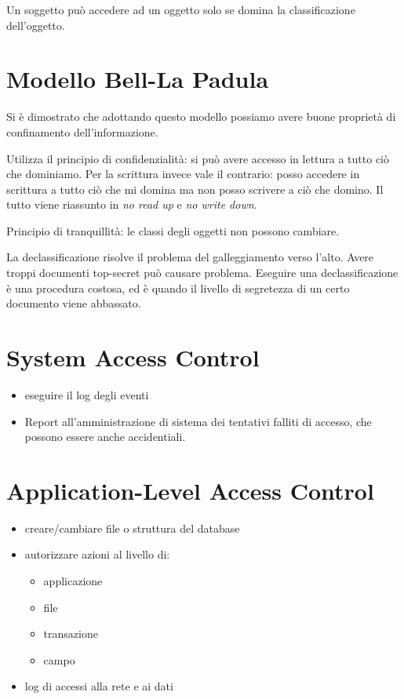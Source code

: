 Un soggetto può accedere ad un oggetto solo se domina la classificazione 
dell'oggetto.

\section{Modello Bell-La Padula}

Si è dimostrato che adottando questo modello possiamo avere buone proprietà di 
confinamento dell'informazione.

Utilizza il principio di confidenzialità: si può avere accesso in lettura a 
tutto ciò che dominiamo. Per la scrittura invece vale il contrario: posso 
accedere in scrittura a tutto ciò che mi domina ma non posso scrivere a ciò che 
domino. Il tutto viene riassunto in \textit{no read up} e \textit{no write 
down}.

Principio di tranquillità: le classi degli oggetti non possono cambiare.


La declassificazione risolve il problema del galleggiamento verso l'alto. Avere 
troppi documenti top-secret può causare problema. Eseguire una 
declassificazione è una procedura costosa, ed è quando il livello di segretezza 
di un certo documento viene abbassato.

\section{System Access Control}

\begin{itemize}
 \item eseguire il log degli eventi
 \item Report all'amministrazione di sistema dei tentativi falliti di accesso, 
 che possono essere anche accidentiali.
\end{itemize}

\section{Application-Level Access Control}

\begin{itemize}
 \item creare/cambiare file o struttura del database
 \item autorizzare azioni al livello di:
  \begin{itemize}
   \item applicazione
   \item file
   \item transazione
   \item campo
  \end{itemize}
\item log di accessi alla rete e ai dati
\end{itemize}

